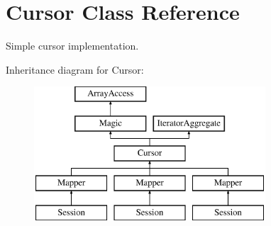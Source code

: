 \hypertarget{class_d_b_1_1_cursor}{}\section{Cursor Class Reference}
\label{class_d_b_1_1_cursor}


Simple cursor implementation.  


Inheritance diagram for Cursor\+:\begin{figure}[H]
\begin{center}
\leavevmode
\includegraphics[height=5.000000cm]{class_d_b_1_1_cursor}
\end{center}
\end{figure}
